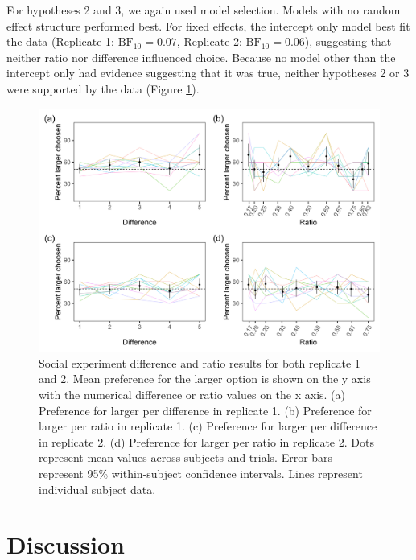 \documentclass[
  ,doc,floatsintext]{apa6}
\begin{document}
For hypotheses 2 and 3, we again used model selection. Models with no random effect structure performed best. For fixed effects, the intercept only model best fit the data (Replicate 1: \(\mathrm{BF}_{\textrm{10}} = 0.07\), Replicate 2: \(\mathrm{BF}_{\textrm{10}} = 0.06\)), suggesting that neither ratio nor difference influenced choice. Because no model other than the intercept only had evidence suggesting that it was true, neither hypotheses 2 or 3 were supported by the data (Figure \ref{fig:socialgraphs}).



\begin{figure}

{\centering \includegraphics[width=1\linewidth]{../figures/social_figure} 

}

\caption{Social experiment difference and ratio results for both replicate 1 and 2. Mean preference for the larger option is shown on the y axis with the numerical difference or ratio values on the x axis. (a) Preference for larger per difference in replicate 1. (b) Preference for larger per ratio in replicate 1. (c) Preference for larger per difference in replicate 2. (d) Preference for larger per ratio in replicate 2. Dots represent mean values across subjects and trials. Error bars represent 95\% within-subject confidence intervals. Lines represent individual subject data.}\label{fig:socialgraphs}
\end{figure}

\hypertarget{discussion}{%
\section{Discussion}\label{discussion}}
\end{document}
